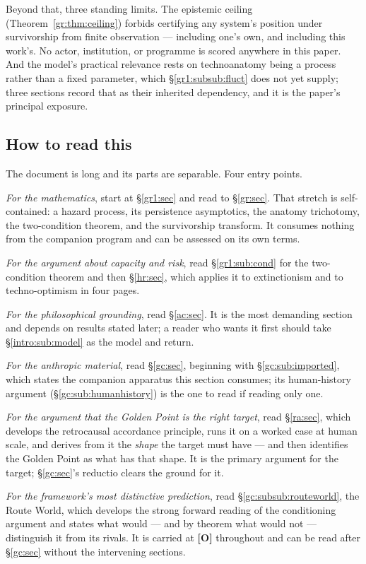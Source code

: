 \documentclass[11pt]{article}
\numberwithin{equation}{section}
\theoremstyle{plain}
\theoremstyle{definition}
\theoremstyle{remark}
\begin{document}
Beyond that, three standing limits. The epistemic ceiling
(Theorem~\ref{gr:thm:ceiling}) forbids certifying any system's position
under survivorship from finite observation --- including one's own, and
including this work's. No actor, institution, or programme is scored
anywhere in this paper. And the model's practical relevance rests on
technoanatomy being a process rather than a fixed parameter, which
\S\ref{gr1:subsub:fluct} does not yet supply; three sections record that
as their inherited dependency, and it is the paper's principal exposure.

\subsection{How to read this}\label{intro:sub:reading}

The document is long and its parts are separable. Four entry points.

\emph{For the mathematics}, start at \S\ref{gr1:sec} and read to
\S\ref{gr:sec}. That stretch is self-contained: a hazard process, its
persistence asymptotics, the anatomy trichotomy, the two-condition
theorem, and the survivorship transform. It consumes nothing from the
companion program and can be assessed on its own terms.

\emph{For the argument about capacity and risk}, read
\S\ref{gr1:sub:cond} for the two-condition theorem and then
\S\ref{hr:sec}, which applies it to extinctionism and to
techno-optimism in four pages.

\emph{For the philosophical grounding}, read \S\ref{ac:sec}. It is the
most demanding section and depends on results stated later; a reader who
wants it first should take \S\ref{intro:sub:model} as the model and
return.

\emph{For the anthropic material}, read \S\ref{gc:sec}, beginning with
\S\ref{gc:sub:imported}, which states the companion apparatus this
section consumes; its human-history argument
(\S\ref{gc:sub:humanhistory}) is the one to read if reading only one.

\emph{For the argument that the Golden Point is the right target}, read
\S\ref{ra:sec}, which develops the retrocausal accordance principle,
runs it on a worked case at human scale, and derives from it the
\emph{shape} the target must have --- and then identifies the Golden
Point as what has that shape. It is the primary argument for the target;
\S\ref{gc:sec}'s reductio clears the ground for it.

\emph{For the framework's most distinctive prediction}, read
\S\ref{gc:subsub:routeworld}, the Route World, which develops the strong
forward reading of the conditioning argument and states what would ---
and by theorem what would not --- distinguish it from its rivals. It is
carried at \textbf{[O]} throughout and can be read after \S\ref{gc:sec}
without the intervening sections.
\end{document}

